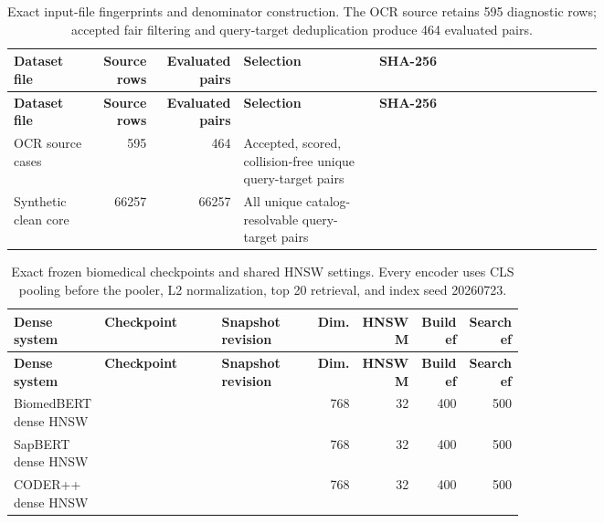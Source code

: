 \begin{scriptsize}
\setlength{\tabcolsep}{1pt}
\renewcommand{\arraystretch}{1.05}
\begin{longtable}{@{}L{0.14\linewidth}rrL{0.23\linewidth}L{0.38\linewidth}@{}}
\caption{Exact input-file fingerprints and denominator construction. The OCR source retains 595 diagnostic rows; accepted fair filtering and query-target deduplication produce 464 evaluated pairs.}\label{tab:expanded-dataset-fingerprints}\\
\toprule
\textbf{Dataset file} & \textbf{Source rows} & \textbf{Evaluated pairs} & \textbf{Selection} & \textbf{SHA-256} \\
\midrule
\endfirsthead
\toprule
\textbf{Dataset file} & \textbf{Source rows} & \textbf{Evaluated pairs} & \textbf{Selection} & \textbf{SHA-256} \\
\midrule
\endhead
OCR source cases & 595 & 464 & Accepted, scored, collision-free unique query-target pairs & \texttt{} \\
Synthetic clean core & 66257 & 66257 & All unique catalog-resolvable query-target pairs & \texttt{} \\
\bottomrule
\end{longtable}
\end{scriptsize}

\begin{landscape}
\begin{tiny}
\setlength{\tabcolsep}{1pt}
\renewcommand{\arraystretch}{1.05}
\begin{longtable}{@{}L{0.16\linewidth}L{0.27\linewidth}L{0.22\linewidth}rrrr@{}}
\caption{Exact frozen biomedical checkpoints and shared HNSW settings. Every encoder uses CLS pooling before the pooler, L2 normalization, top 20 retrieval, and index seed 20260723.}\label{tab:expanded-dense-configuration}\\
\toprule
\textbf{Dense system} & \textbf{Checkpoint} & \textbf{Snapshot revision} & \textbf{Dim.} & \textbf{HNSW M} & \textbf{Build ef} & \textbf{Search ef} \\
\midrule
\endfirsthead
\toprule
\textbf{Dense system} & \textbf{Checkpoint} & \textbf{Snapshot revision} & \textbf{Dim.} & \textbf{HNSW M} & \textbf{Build ef} & \textbf{Search ef} \\
\midrule
\endhead
BiomedBERT dense HNSW &  &  & 768 & 32 & 400 & 500 \\
SapBERT dense HNSW &  &  & 768 & 32 & 400 & 500 \\
CODER++ dense HNSW &  &  & 768 & 32 & 400 & 500 \\
\bottomrule
\end{longtable}
\end{tiny}

\end{landscape}

